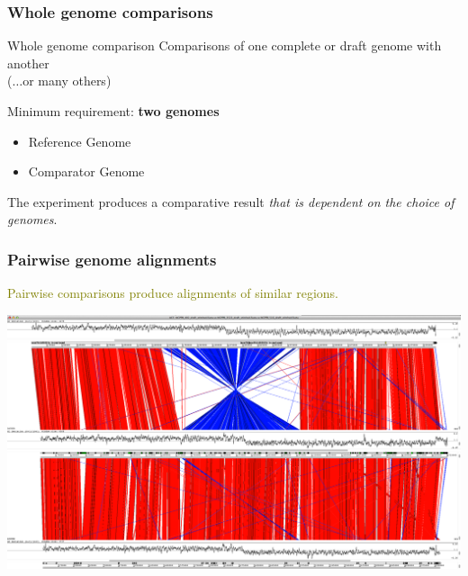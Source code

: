 
\begin{frame}
  \frametitle{Whole genome comparisons}
    \begin{alertblock}{Whole genome comparison}
      Comparisons of one complete or draft genome with another \\
      ($\ldots$or many others)
    \end{alertblock}
  Minimum requirement: \textbf{two genomes} \\
  \begin{itemize}
    \item \textcolor{hutton_green}{Reference Genome}
    \item \textcolor{hutton_blue}{Comparator Genome}
  \end{itemize}
  The experiment produces a comparative result \textcolor{hutton_purple}{\textit{that is dependent on the choice of genomes}}.    
\end{frame}

\begin{frame}
  \frametitle{Pairwise genome alignments}
  \textcolor{olive}{Pairwise comparisons produce alignments of similar regions.}
  \begin{center}
    \includegraphics[width=\textwidth]{images/pairwise_genome_alignment}
  \end{center}  
\end{frame}

